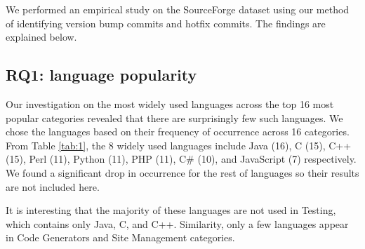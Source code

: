 \documentclass{sig-alternate}
\begin{document}
We performed an empirical study on the SourceForge dataset using our method of identifying version bump commits and hotfix commits. The findings are explained below.
\subsection{RQ1: language popularity}
Our investigation on the most widely used languages across the top 16 most popular categories revealed that there are surprisingly few such languages. We chose the languages based on their frequency of occurrence across 16 categories. From Table \ref{tab:1}, the 8 widely used languages include Java (16), C (15), C++ (15), Perl (11), Python (11), PHP (11), C\# (10), and JavaScript (7) respectively.  We found a significant drop in occurrence for the rest of languages so their results are not included here.  %

It is interesting that the majority of these languages are not used in Testing, which contains only Java, C, and C++. Similarity, only a few languages appear in Code Generators and Site Management categories.

\end{document}
